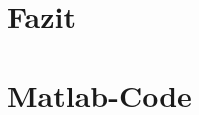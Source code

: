 \section{Fazit}
\begin{quote}
     
\end{quote}

\section{Matlab-Code}
\begin{quote}
%             
    	
\end{quote}


